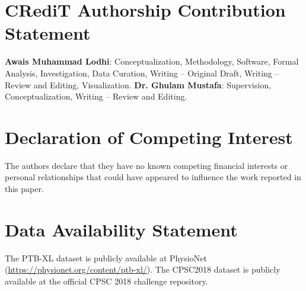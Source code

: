 \documentclass[5p,twocolumn,10pt]{elsarticle}
\begin{document}
\section*{CRediT Authorship Contribution Statement}
\textbf{Awais Muhammad Lodhi}: Conceptualization, Methodology, Software, Formal Analysis, Investigation, Data Curation, Writing -- Original Draft, Writing -- Review and Editing, Visualization.
\textbf{Dr. Ghulam Mustafa}: Supervision, Conceptualization, Writing -- Review and Editing.

\section*{Declaration of Competing Interest}
The authors declare that they have no known competing financial interests or personal relationships that could have appeared to influence the work reported in this paper.

\section*{Data Availability Statement}
The PTB-XL dataset is publicly available at PhysioNet (\url{https://physionet.org/content/ptb-xl/}). The CPSC2018 dataset is publicly available at the official CPSC 2018 challenge repository.



\end{document}
